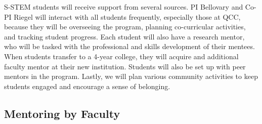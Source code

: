 \documentclass[12pt]{article}
\begin{document}


S-STEM students will receive support from several sources.  PI Bellovary and Co-PI Riegel will interact with all students frequently, especially those at QCC, because they will be overseeing the program, planning co-curricular activities, and tracking student progress.  Each student will also have a research mentor, who will be tasked with the professional and skills development of their mentees.  When students transfer to a 4-year college, they will acquire and additional faculty mentor at their new institution.  Students will also be set up with peer mentors in the program.  Lastly, we will plan various community activities to keep students engaged and encourage a sense of belonging.
\vspace{-3mm}

\subsection{Mentoring by Faculty}
\end{document}
